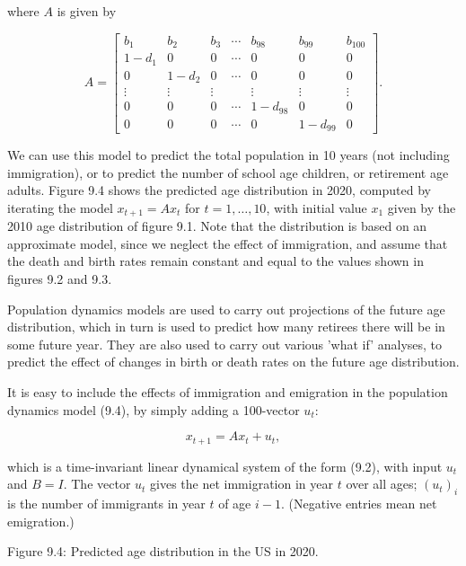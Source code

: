 where \(A\) is given by

\[A=\left[\begin{array}{cccccccc}b_{1}&b_{2}&b_{3}&\cdots&b_{98}&b_{99}&b_{100}\\ 1-d_{1}&0&0&\cdots&0&0&0\\ 0&1-d_{2}&0&\cdots&0&0&0\\ \vdots&\vdots&\vdots&&\vdots&\vdots&\vdots\\ 0&0&0&\cdots&1-d_{98}&0&0\\ 0&0&0&\cdots&0&1-d_{99}&0\end{array}\right].\]

We can use this model to predict the total population in 10 years (not including immigration), or to predict the number of school age children, or retirement age adults. Figure 9.4 shows the predicted age distribution in 2020, computed by iterating the model \(x_{t+1}=Ax_{t}\) for \(t=1,\ldots,10\), with initial value \(x_{1}\) given by the 2010 age distribution of figure 9.1. Note that the distribution is based on an approximate model, since we neglect the effect of immigration, and assume that the death and birth rates remain constant and equal to the values shown in figures 9.2 and 9.3.

Population dynamics models are used to carry out projections of the future age distribution, which in turn is used to predict how many retirees there will be in some future year. They are also used to carry out various 'what if' analyses, to predict the effect of changes in birth or death rates on the future age distribution.

It is easy to include the effects of immigration and emigration in the population dynamics model (9.4), by simply adding a 100-vector \(u_{t}\):

\[x_{t+1}=Ax_{t}+u_{t},\]

which is a time-invariant linear dynamical system of the form (9.2), with input \(u_{t}\) and \(B=I\). The vector \(u_{t}\) gives the net immigration in year \(t\) over all ages; \((u_{t})_{i}\) is the number of immigrants in year \(t\) of age \(i-1\). (Negative entries mean net emigration.)

Figure 9.4: Predicted age distribution in the US in 2020.

 